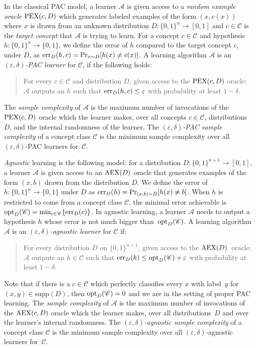 \documentclass[twoside,11pt]{article}
\newcommand{\eps}{\varepsilon}
\newcommand{\PEX}{\mbox{\rm PEX}}
\newcommand{\AEX}{\mbox{\rm AEX}}
\newcommand{\err}{\mbox{\rm err}}
\newcommand{\opt}{\mbox{\rm opt}}
\newcommand{\supp}{\mathrm{supp}}
\DeclareMathOperator*{\argmax}{arg\,max}
\newcommand{\A}{\ensuremath{\mathcal{A}}}
\def\01{\{0,1\}}
\newcommand{\C}{\ensuremath{\mathscr{C}}}
\begin{document}
In the classical PAC model, a learner $\A$ is given access to a \emph{random example oracle} $\PEX(c,D)$ which generates labeled examples of the form $(x,c(x))$ where $x$ is drawn from an unknown distribution $D:\01^n\rightarrow [0,1]$ and $c\in \C$ is the \emph{target concept} that $\A$ is trying to learn. For  a concept $c\in \C$ and hypothesis $h:\01^n\rightarrow \01$, we define the error of $h$ compared to the target concept $c$, under $D$, as $\err_D(h,c)=\Pr_{x\sim D}[h(x)\neq c(x)]$. A learning algorithm $\A$ is an \emph{$(\eps,\delta)$-PAC learner} for $\C$, if the following holds: 
\begin{quote}
	For every $c\in\C$ and distribution $D$, given access to the $\PEX(c,D)$ oracle:\\ 
	$\A$ outputs an $h$ such that $\err_D(h,c)\leq \eps$ with probability at least $1-\delta$. 
\end{quote}
The \emph{sample complexity} of $\A$ is the maximum number of invocations of the $\PEX(c,D)$ oracle which the learner makes, over all concepts $c\in \C$, distributions $D$, and the internal randomness of the learner. The \emph{$(\eps,\delta)$-PAC sample complexity} of a concept class $\C$ is the minimum sample complexity over all $(\eps,\delta)$-PAC learners for~$\C$. 

\emph{Agnostic} learning is the following model: for a distribution $D:\01^{n+1}\rightarrow [0,1]$, a learner $\A$ is given access to an $\AEX(D)$ oracle that generates examples of the form $(x,b)$ drawn from the distribution $D$.  We define the error of $h:\01^n\rightarrow \01$ under $D$ as $\err_D(h)=\Pr_{(x,b)\sim D}[h(x)\neq b]$. When $h$ is restricted to come from a concept class $\C$, 
the minimal error achievable is $\opt_D(\C)=\min_{c\in \C} \{\err_D(c)\}$. 
In agnostic learning, a learner $\A$ needs to output a hypothesis $h$ whose error is not much bigger than~$\opt_D(\C)$.
A learning algorithm $\A$ is an \emph{$(\eps,\delta)$-agnostic learner} for $\C$ if: 
\begin{quote}
	For every distribution $D$ on $\01^{n+1}$, given access to the $\AEX(D)$~oracle:\\ 
	$\A$ outputs an $h\in\C$ such that $\err_D(h)\leq \opt_D(\C)+\eps$ with probability at least $1-\delta$.
\end{quote}
Note that if there is a $c\in \C$ which perfectly classifies every $x$ with label~$y$ for $(x,y)\in \supp(D)$, then $\opt_D(\C)=0$ and we are in the setting of proper PAC learning. The \emph{sample complexity} of $\A$ is the maximum number of invocations of the $\AEX(c,D)$ oracle which the learner makes, over all distributions~$D$ and over the learner's internal randomness. The \emph{$(\eps,\delta)$-agnostic sample complexity} of a concept class $\C$ is the minimum sample complexity over all $(\eps,\delta)$-agnostic learners for~$\C$. 
\end{document}
